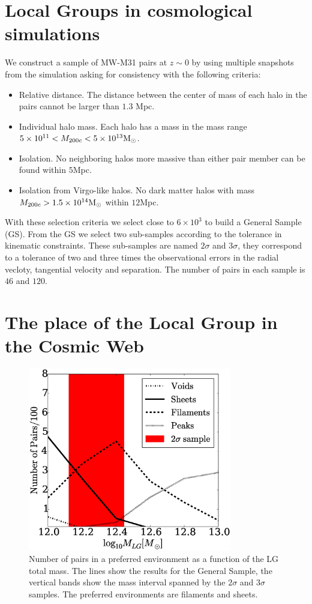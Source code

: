 \documentclass{iau}
\newcommand{\Msun}{{\ifmmode{{\rm {M_{\odot}}}}\else{${\rm{M_{\odot}}}$}\fi}}
\begin{document}
\section{Local Groups in cosmological simulations}
We construct a sample of MW-M31 pairs at $z\sim 0$ by using multiple
snapshots from the simulation asking for consistency with the
following criteria:

\begin{itemize}
\item Relative distance. The distance between the center of mass of
  each halo in the pairs cannot be larger than $1.3$ Mpc.
\item Individual halo mass. Each halo has a mass in the mass range
  $5\times 10^{11}<M_{200c}<5\times 10^{13}\Msun$.  
\item  Isolation. No neighboring halos more massive than either pair
member can be found within $5$Mpc.
\item Isolation from Virgo-like halos. No dark matter halos with mass
  $M_{200c}>1.5\times 10^{14}\Msun$ within $12$Mpc.
\end{itemize}

With these selection criteria we select close to $6\times 10^3$ to build
a General Sample (GS). From the GS we select two sub-samples
according to the tolerance in kinematic constraints. These sub-samples 
are named $2\sigma$ and $3\sigma$, they correspond to a tolerance of
two and three times the observational errors in the radial vecloty,
tangential velocity and separation. The number of pairs in each sample
is $46$ and $120$.  

\section{The place of the Local Group in the Cosmic Web}

\begin{figure}[t]
\begin{center}
 \includegraphics[width=3.5in]{histogram_mass_distro.eps} 
 \caption{Number of pairs in a preferred environment as a function of
   the LG total mass. The lines show the results for the General
   Sample, the vertical bands show the mass interval spanned by the
   $2\sigma$ and $3\sigma$ samples. The preferred environments are
   filaments and sheets.}
   \label{fig:environment}
\end{center}
\end{figure}
\end{document}
